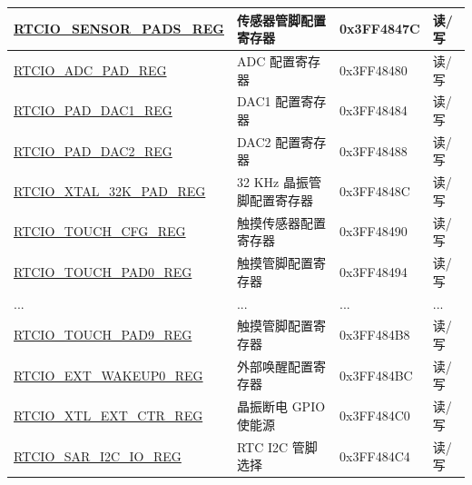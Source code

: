 \begin{longtable}{ | p{6.7cm} | p{6.5cm} | p{1.9cm} | p{0.9cm} | }
\hyperref[regdesc:RTCIOSENSORPADSREG]{RTCIO\_SENSOR\_PADS\_REG} & 传感器管脚配置寄存器 & 0x3FF4847C & 读/写 \\ \hline
\hyperref[regdesc:RTCIOADCPADREG]{RTCIO\_ADC\_PAD\_REG} & ADC 配置寄存器 & 0x3FF48480 & 读/写 \\ \hline
\hyperref[regdesc:RTCIOPADDAC1REG]{RTCIO\_PAD\_DAC1\_REG} & DAC1 配置寄存器 & 0x3FF48484 &读/写 \\ \hline
\hyperref[regdesc:RTCIOPADDAC2REG]{RTCIO\_PAD\_DAC2\_REG} & DAC2 配置寄存器 & 0x3FF48488 & 读/写 \\ \hline
\hyperref[regdesc:RTCIOXTAL32KPADREG]{RTCIO\_XTAL\_32K\_PAD\_REG} & 32 KHz 晶振管脚配置寄存器 & 0x3FF4848C & 读/写 \\ \hline
\hyperref[regdesc:RTCIOTOUCHCFGREG]{RTCIO\_TOUCH\_CFG\_REG} & 触摸传感器配置寄存器 & 0x3FF48490 & 读/写 \\ \hline
\hyperref[regdesc:RTCIOTOUCHPADnREG]{RTCIO\_TOUCH\_PAD0\_REG} & 触摸管脚配置寄存器 & 0x3FF48494 & 读/写 \\ \hline
... & ... &... &... \\ \hline
\hyperref[regdesc:RTCIOTOUCHPADnREG]{RTCIO\_TOUCH\_PAD9\_REG} & 触摸管脚配置寄存器 & 0x3FF484B8 & 读/写 \\ \hline
\hyperref[regdesc:RTCIOEXTWAKEUP0REG]{RTCIO\_EXT\_WAKEUP0\_REG} & 外部唤醒配置寄存器 & 0x3FF484BC & 读/写 \\ \hline
\hyperref[regdesc:RTCIOXTLEXTCTRREG]{RTCIO\_XTL\_EXT\_CTR\_REG} & 晶振断电 GPIO 使能源 & 0x3FF484C0 & 读/写 \\ \hline
\hyperref[regdesc:RTCIOSARI2CIOREG]{RTCIO\_SAR\_I2C\_IO\_REG} & RTC I2C 管脚选择 & 0x3FF484C4 & 读/写\\ \hline
\end{longtable}
